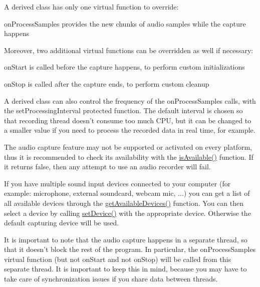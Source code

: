 A derived class has only one virtual function to override\-: \begin{DoxyItemize}
\item on\-Process\-Samples provides the new chunks of audio samples while the capture happens\end{DoxyItemize}
Moreover, two additional virtual functions can be overridden as well if necessary\-: \begin{DoxyItemize}
\item on\-Start is called before the capture happens, to perform custom initializations \item on\-Stop is called after the capture ends, to perform custom cleanup\end{DoxyItemize}
A derived class can also control the frequency of the on\-Process\-Samples calls, with the set\-Processing\-Interval protected function. The default interval is chosen so that recording thread doesn't consume too much C\-P\-U, but it can be changed to a smaller value if you need to process the recorded data in real time, for example.

The audio capture feature may not be supported or activated on every platform, thus it is recommended to check its availability with the \hyperlink{classsf_1_1_sound_recorder_aab2bd0fee9e48d6cfd449b1cb078ce5a}{is\-Available()} function. If it returns false, then any attempt to use an audio recorder will fail.

If you have multiple sound input devices connected to your computer (for example\-: microphone, external soundcard, webcam mic, ...) you can get a list of all available devices through the \hyperlink{classsf_1_1_sound_recorder_a26198c5c11efcd61f426f326fe314afe}{get\-Available\-Devices()} function. You can then select a device by calling \hyperlink{classsf_1_1_sound_recorder_a8eb3e473292c16e874322815836d3cd3}{set\-Device()} with the appropriate device. Otherwise the default capturing device will be used.

It is important to note that the audio capture happens in a separate thread, so that it doesn't block the rest of the program. In particular, the on\-Process\-Samples virtual function (but not on\-Start and not on\-Stop) will be called from this separate thread. It is important to keep this in mind, because you may have to take care of synchronization issues if you share data between threads.

